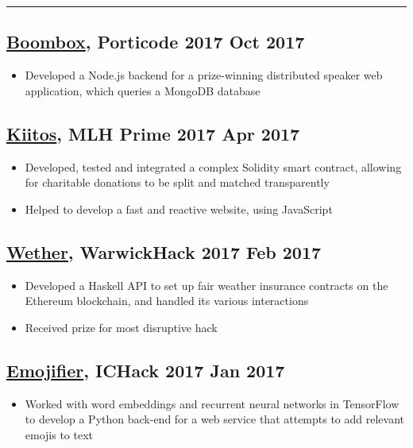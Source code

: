 \documentclass[a4paper, 8pt]{extarticle}
\begin{document}
\begin{minipage}[t]{.66\textwidth}
\vspace{-2pt}
\noindent\textcolor{lightgray}{\rule{\linewidth}{0.5pt}}

\subsection*{\href{https://devpost.com/software/boombox-s7zmce}{Boombox}, Porticode 2017 \hfill Oct 2017}
\begin{itemize}
\item Developed a Node.js backend for a prize-winning distributed speaker web application, which queries a MongoDB database
\end{itemize}

\subsection*{\href{https://devpost.com/software/kiitos}{Kiitos}, MLH Prime 2017 \hfill Apr 2017}
\begin{itemize}
\item Developed, tested and integrated a complex Solidity smart contract, allowing for charitable donations to be split and matched transparently
\item Helped to develop a fast and reactive website, using JavaScript
\end{itemize}

\subsection*{\href{https://devpost.com/software/weather-g8lp3r}{Wether}, WarwickHack 2017 \hfill Feb 2017}
\begin{itemize}
\item Developed a Haskell API to set up fair weather insurance contracts on the Ethereum blockchain, and handled its various interactions
\item Received prize for most disruptive hack
\end{itemize}

\subsection*{\href{https://devpost.com/software/emojifier}{Emojifier}, ICHack 2017 \hfill Jan 2017}
\begin{itemize}
\item Worked with word embeddings and recurrent neural networks in TensorFlow to develop a Python back-end for a web service that attempts to add relevant emojis to text
\end{itemize}

\end{minipage}%
\end{document}
